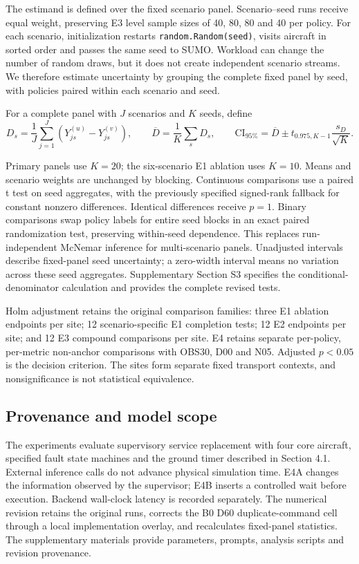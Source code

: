 \documentclass[]{interact}
\theoremstyle{plain}
\theoremstyle{definition}
\theoremstyle{remark}
\begin{document}
The estimand is defined over the fixed scenario panel. Scenario--seed runs receive equal weight, preserving E3 level sample sizes of 40, 80, 80 and 40 per policy. For each scenario, initialization restarts \nolinkurl{random.Random(seed)}, visits aircraft in sorted order and passes the same seed to SUMO. Workload can change the number of random draws, but it does not create independent scenario streams. We therefore estimate uncertainty by grouping the complete fixed panel by seed, with policies paired within each scenario and seed.

For a complete panel with $J$ scenarios and $K$ seeds, define
\begin{equation*}
D_s=\frac{1}{J}\sum_{j=1}^J(Y^{(u)}_{js}-Y^{(v)}_{js}),\qquad
\overline D=\frac1K\sum_sD_s,\qquad
\mathrm{CI}_{95\%}=\overline D\pm t_{0.975,K-1}\frac{s_D}{\sqrt K}.\tag{13}
\end{equation*}

Primary panels use $K=20$; the six-scenario E1 ablation uses $K=10$. Means and scenario weights are unchanged by blocking. Continuous comparisons use a paired t test on seed aggregates, with the previously specified signed-rank fallback for constant nonzero differences. Identical differences receive $p=1$. Binary comparisons swap policy labels for entire seed blocks in an exact paired randomization test, preserving within-seed dependence. This replaces run-independent McNemar inference for multi-scenario panels. Unadjusted intervals describe fixed-panel seed uncertainty; a zero-width interval means no variation across these seed aggregates. Supplementary Section S3 specifies the conditional-denominator calculation and provides the complete revised tests.

Holm adjustment retains the original comparison families: three E1 ablation endpoints per site; 12 scenario-specific E1 completion tests; 12 E2 endpoints per site; and 12 E3 compound comparisons per site. E4 retains separate per-policy, per-metric non-anchor comparisons with OBS30, D00 and N05. Adjusted $p<0.05$ is the decision criterion. \citep{ref18} The sites form separate fixed transport contexts, and nonsignificance is not statistical equivalence.

\subsection{Provenance and model scope}

The experiments evaluate supervisory service replacement with four core aircraft, specified fault state machines and the ground timer described in Section 4.1. External inference calls do not advance physical simulation time. E4A changes the information observed by the supervisor; E4B inserts a controlled wait before execution. Backend wall-clock latency is recorded separately. The numerical revision retains the original runs, corrects the B0 D60 duplicate-command cell through a local implementation overlay, and recalculates fixed-panel statistics. The supplementary materials provide parameters, prompts, analysis scripts and revision provenance.
\end{document}
